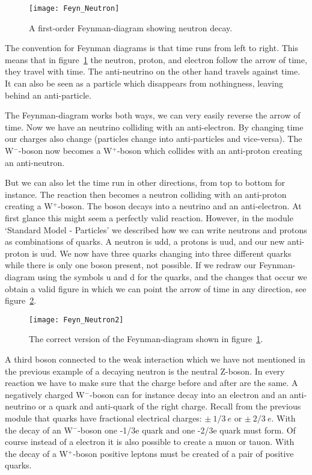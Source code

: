 \begin{figure}\begin{center}
\texttt{[image: Feyn\_Neutron]}%
\caption{A first-order Feynman-diagram showing neutron decay.}\label{fig:Feyn_Neutron}
\end{center}\end{figure}

The convention for Feynman diagrams is that time runs from left to right. This means that in figure~\ref{fig:Feyn_Neutron} the neutron, proton, and electron follow the arrow of time, they travel with time. The anti-neutrino on the other hand travels against time. It can also be seen as a particle which disappears from nothingness, leaving behind an anti-particle.

The Feynman-diagram works both ways, we can very easily reverse the arrow of time. Now we have an neutrino colliding with an anti-electron. By changing time our charges also change (particles change into anti-particles and vice-versa). The W$^-$-boson now becomes a W$^+$-boson which collides with an anti-proton creating an anti-neutron.

But we can also let the time run in other directions, from top to bottom for instance. The reaction then becomes a neutron colliding with an anti-proton creating a W$^+$-boson. The boson decays into a neutrino and an anti-electron. At first glance this might seem a perfectly valid reaction. However, in the module `Standard Model - Particles' we described how we can write neutrons and protons as combinations of quarks. A neutron is udd, a protons is uud, and our new anti-proton is $\overline{\mbox{uud}}$. We now have three quarks changing into three different quarks while there is only one boson present, not possible. If we redraw our Feynman-diagram using the symbols u and d for the quarks, and the changes that occur we obtain a valid figure in which we can point the arrow of time in any direction, see figure~\ref{fig:Feyn_Neutron2}.

\begin{figure}\begin{center}
\texttt{[image: Feyn\_Neutron2]}%
\caption{The correct version of the Feynman-diagram shown in figure~\ref{fig:Feyn_Neutron}.}\label{fig:Feyn_Neutron2}
\end{center}\end{figure}

A third boson connected to the weak interaction which we have not mentioned in the previous example of a decaying neutron is the neutral Z-boson. In every reaction we have to make sure that the charge before and after are the same. A negatively charged W$^-$-boson can for instance decay into an electron and an anti-neutrino or a quark and anti-quark of the right charge. Recall from the previous module that quarks have fractional electrical charges: $\pm~1/3~e$ or $\pm~2/3~e$. With the decay of an W$^-$-boson one -1/3e quark and one -2/3e quark must form. Of course instead of a electron it is also possible to create a muon or tauon. With the decay of a W$^+$-boson positive leptons must be created of a pair of positive quarks.

